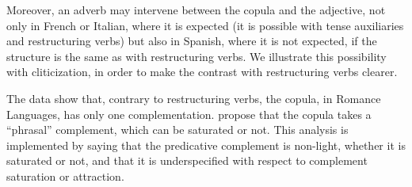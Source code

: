 \documentclass[output=paper
	        ,collection
	        ,collectionchapter
 	        ,biblatex
                ,babelshorthands
                ,newtxmath
                ,draftmode
                ,colorlinks, citecolor=brown
]{langscibook}
\begin{document}
{\begin{exe}
\begin{xlist}
    \label{GSexemple33b} 
		
	\label{GSexemple33c} 
	\end{xlist}
\end{exe}

Moreover, an adverb may intervene between the copula and the adjective, not only in French or Italian, where it is expected (it is possible with tense auxiliaries and restructuring verbs) but also in Spanish, where it is not expected, if the structure is the same as with restructuring verbs. We illustrate this possibility with cliticization, in order to make the contrast with restructuring verbs clearer.

\eal
	\label{GSexemple34} 
	\label{GSexemple34a}

	\label{GSexemple34b}
		
	\label{GSexemple34c}
\zl

The data show that, contrary to restructuring verbs, the copula, in Romance Languages, has only one complementation. \citet{AG2002b-u,AG2010} propose that the copula takes a ``phrasal'' complement, which can be saturated or not. This analysis is implemented by saying that the predicative complement is non-light, whether it is saturated or not, and that it is underspecified with respect to complement saturation or attraction.

}
\end{document}
